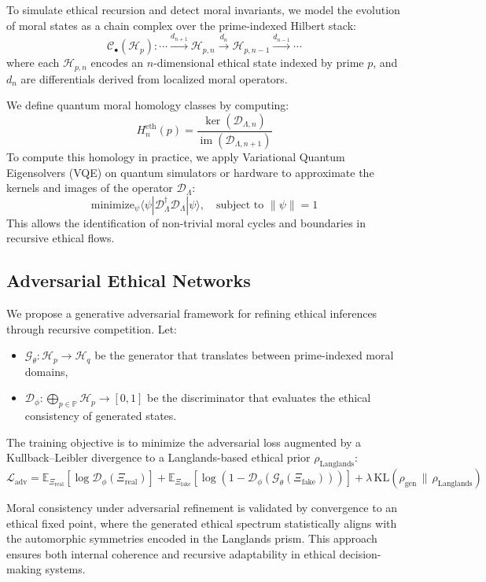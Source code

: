 \documentclass{article}
\theoremstyle{plain}
\theoremstyle{claimstyle}
\begin{document}
To simulate ethical recursion and detect moral invariants, we model the evolution of moral states as a chain complex over the prime-indexed Hilbert stack:
\[
\mathcal{C}_\bullet(\mathcal{H}_p): \cdots \xrightarrow{d_{n+1}} \mathcal{H}_{p,n} \xrightarrow{d_n} \mathcal{H}_{p,n-1} \xrightarrow{d_{n-1}} \cdots
\]
where each $\mathcal{H}_{p,n}$ encodes an $n$-dimensional ethical state indexed by prime $p$, and $d_n$ are differentials derived from localized moral operators.

We define quantum moral homology classes by computing:
\[
H_n^{\mathrm{eth}}(p) = \frac{\ker(\mathcal{D}_{\Lambda,n})}{\operatorname{im}(\mathcal{D}_{\Lambda,n+1})}
\]
To compute this homology in practice, we apply Variational Quantum Eigensolvers (VQE) on quantum simulators or hardware to approximate the kernels and images of the operator $\mathcal{D}_\Lambda$:
\[
\text{minimize}_{\psi} \langle \psi | \mathcal{D}_\Lambda^\dagger \mathcal{D}_\Lambda | \psi \rangle, \quad \text{subject to } \| \psi \| = 1
\]
This allows the identification of non-trivial moral cycles and boundaries in recursive ethical flows.

\subsection{Adversarial Ethical Networks}

We propose a generative adversarial framework for refining ethical inferences through recursive competition. Let:
\begin{itemize}
    \item $\mathcal{G}_\theta: \mathcal{H}_p \rightarrow \mathcal{H}_q$ be the generator that translates between prime-indexed moral domains,
    \item $\mathcal{D}_\phi: \bigoplus_{p \in \mathbb{P}} \mathcal{H}_p \rightarrow [0,1]$ be the discriminator that evaluates the ethical consistency of generated states.
\end{itemize}

The training objective is to minimize the adversarial loss augmented by a Kullback–Leibler divergence to a Langlands-based ethical prior $\rho_{\mathrm{Langlands}}$:
\[
\mathcal{L}_{\mathrm{adv}} = \mathbb{E}_{\Xi_{\mathrm{real}}}[\log \mathcal{D}_\phi(\Xi_{\mathrm{real}})] + \mathbb{E}_{\Xi_{\mathrm{fake}}}[\log(1 - \mathcal{D}_\phi(\mathcal{G}_\theta(\Xi_{\mathrm{fake}})))] + \lambda \, \mathrm{KL}(\rho_{\mathrm{gen}} \, \| \, \rho_{\mathrm{Langlands}})
\]

Moral consistency under adversarial refinement is validated by convergence to an ethical fixed point, where the generated ethical spectrum statistically aligns with the automorphic symmetries encoded in the Langlands prism. This approach ensures both internal coherence and recursive adaptability in ethical decision-making systems.
\end{document}

